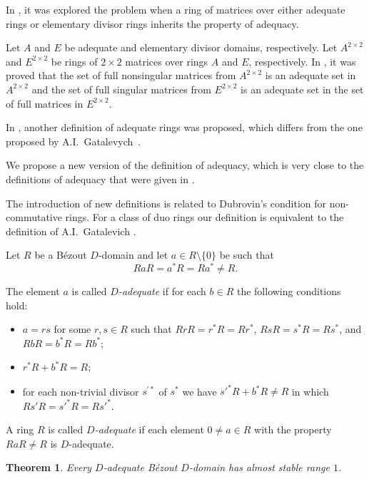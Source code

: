 \documentclass[10pt,a4paper]{amsart}
\theoremstyle{plain}
\newtheorem{theorem}{Theorem}
\theoremstyle{definition}
\begin{document}
In \cite{Shchedryk_Gatalevich}, it was explored the problem when  a ring of matrices over either adequate rings or elementary divisor rings inherits the property of adequacy.

Let  $A$ and $E$ be   adequate and elementary divisor domains, respectively. Let  $A^{2 \times 2}$ and $E^{2 \times 2}$  be    rings of ${2 \times 2}$ matrices over rings  $A$ and $E$, respectively. In \cite{Shchedryk_Gatalevich}, it was  proved that the set of full nonsingular matrices from $A^{2 \times 2}$ is an  adequate  set in $A^{2 \times 2}$ and the set of full singular matrices from $E^{2 \times 2}$ is an  adequate set  in the set of full matrices in $E^{2 \times 2}$.


In \cite{Bovdi_Shchedryk_adecvate}, another definition of adequate rings was proposed,
which differs from the one  proposed by A.I.~Gatalevych~\cite[Definition 1, p.\,116]{Gatalevich}.


We  propose a  new version of the definition of adequacy, which is very close to the definitions of adequacy that were given in \cite{Gatalevich, Shchedryk_Gatalevich,Bovdi_Shchedryk_adecvate}.

The introduction of new definitions is related to Dubrovin's condition for non-commutative rings. For a class of duo rings our definition is equivalent to the definition of A.I.~Gatalevich \cite[Definition 1, p.\,116]{Gatalevich}.

Let $R$ be a B\'ezout $D$-domain and  let $a\in R\setminus\{0\}$ be such that
\[
RaR=a^*R=Ra^*\ne R.
\]

The element $a$ is called  {\it $D$-adequate} if for each $b\in R$  the following conditions hold:
\begin{itemize}
\item[(i)] $a=rs$ for some $r,s\in R$ such that  $RrR=r^*R=Rr^*$, $RsR=s^*R=Rs^*$, and  \linebreak $RbR=b^*R=Rb^*$;
\item[(ii)]$r^*R+b^*R=R$;
\item[(iii)]for each non-trivial divisor $s^{\prime *}$ of $s^*$ we have $s'^*R+b^*R\ne R$ in which  $Rs'R=s'^*R=Rs'^*$.
\end{itemize}

A ring $R$ is called {\it $D$-adequate} if each  element $0\not=a\in R$ with the property  $RaR\ne R$  is $D$-adequate.




\begin{theorem}\label{T:11}
Every    $D$-adequate B\'ezout $D$-domain  has  almost stable range $1$.
\end{theorem}
\end{document}
